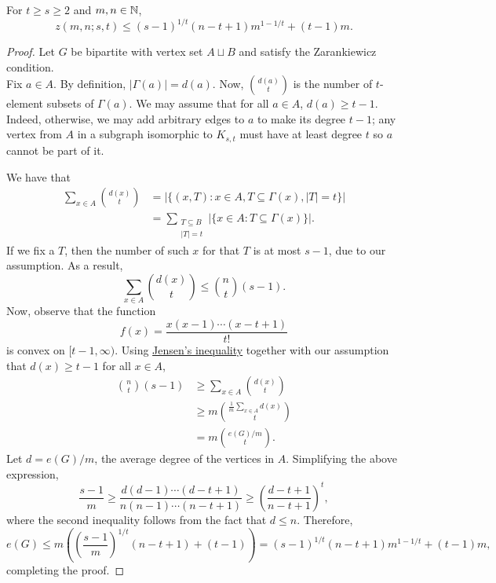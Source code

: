 		\begin{ftheo}
			\label{theo: kovari sos turan}
			For $t\ge s\ge 2$ and $m,n\in\mathbb{N}$,
			$$z(m,n;s,t) \le (s-1)^{1/t} (n-t+1)m^{1-1/t} + (t-1)m.$$
		\end{ftheo}
		\begin{proof}
			Let $G$ be bipartite with vertex set $A \sqcup B$ and satisfy the Zarankiewicz condition.\\
			Fix $a \in A$. By definition, $|\Gamma(a)| = d(a)$. Now, $\binom{d(a)}{t}$ is the number of $t$-element subsets of $\Gamma(a)$. We may assume that for all $a \in A$, $d(a) \ge t-1$. Indeed, otherwise, we may add arbitrary edges to $a$ to make its degree $t-1$; any vertex from $A$ in a subgraph isomorphic to $K_{s,t}$ must have at least degree $t$ so $a$ cannot be part of it.

			We have that
			\begin{align*}
				\sum_{x \in A} \binom{d(x)}{t} &= \left| \{ (x,T) : x \in A, T \subseteq \Gamma(x), |T|=t \} \right| \\
				&= \sum_{\substack{T \subseteq B \\ |T| = t}} |\{x \in A : T \subseteq \Gamma(x)\}|.
			\end{align*}
			If we fix a $T$, then the number of such $x$ for that $T$ is at most $s-1$, due to our assumption. As a result,
			\[ \sum_{x \in A} \binom{d(x)}{t} \le \binom{n}{t} (s-1). \]
			Now, observe that the function
			\[ f(x) = \frac{x(x-1)\cdots(x-t+1)}{t!} \]
			is convex on $[t-1,\infty)$.
			Using \href{https://en.wikipedia.org/wiki/Jensen%27s_inequality#Finite_form}{Jensen's inequality} together with our assumption that $d(x) \ge t-1$ for all $x\in A$,
			\begin{align}
				\binom{n}{t} (s-1) &\ge \sum_{x\in A} \binom{d(x)}{t} \nonumber \\
				 &\ge m \binom{\frac{1}{m}\sum_{x\in A} d(x)}{t} \nonumber
				  \\
				 &= m \binom{e(G)/m}{t}. \label{eqn: kovari sos turan intermediate step}
			\end{align}
			Let $d = e(G)/m$, the average degree of the vertices in $A$. Simplifying the above expression,
			\[ \frac{s-1}{m} \ge \frac{d(d-1)\cdots (d-t+1)}{n(n-1)\cdots(n-t+1)} \ge \left(\frac{d-t+1}{n-t+1}\right)^t, \]
			where the second inequality follows from the fact that $d \le n$. Therefore,
			\[ e(G) \le m \left( \left(\frac{s-1}{m}\right)^{1/t} (n-t+1) + (t-1) \right) = (s-1)^{1/t} (n-t+1) m^{1 - 1/t} + (t-1)m, \]
			completing the proof.
		\end{proof}


